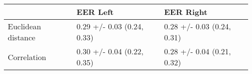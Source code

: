 \begin{tabular}{lll}
\toprule
{} &                    EER Left &                   EER Right \\
\midrule
Euclidean distance &  0.29 +/- 0.03 (0.24, 0.33) &  0.28 +/- 0.03 (0.24, 0.31) \\
Correlation        &  0.30 +/- 0.04 (0.22, 0.35) &  0.28 +/- 0.04 (0.21, 0.32) \\
\bottomrule
\end{tabular}
